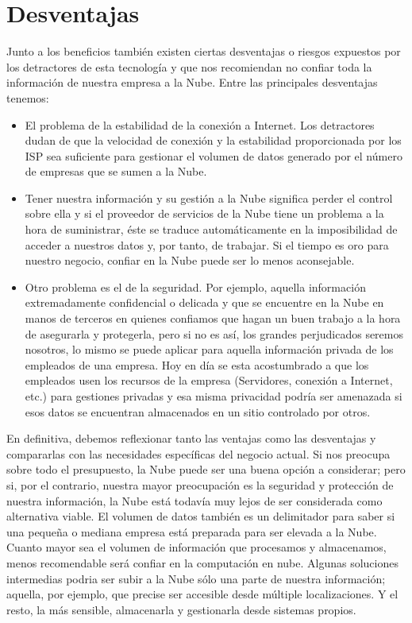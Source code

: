\documentclass[a4paper, 12pt]{report}
\begin{document}
\section{Desventajas}
\begin{justify}
Junto a los beneficios tambi\'en existen ciertas desventajas o riesgos expuestos por los
detractores de esta tecnolog\'ia y que nos recomiendan no confiar toda la informaci\'on de nuestra empresa a la Nube.
Entre las principales desventajas tenemos:
				\begin{itemize}
						\item{}El problema de la estabilidad de la conexi\'on a Internet. Los detractores dudan de que la velocidad de conexi\'on y la estabilidad proporcionada por los ISP sea suficiente para gestionar el volumen de datos generado por el n\'umero de empresas que se sumen a la Nube. 
						\item{} Tener nuestra informaci\'on y su gesti\'on a la Nube significa perder el control sobre ella y si el proveedor de servicios de la Nube tiene un problema a la hora de suministrar, \'este se traduce autom\'aticamente en la imposibilidad de acceder a nuestros datos y, por tanto, de trabajar. Si el tiempo es oro para nuestro negocio, confiar en la Nube puede ser lo menos aconsejable.

						\item{}Otro problema es el de la seguridad. Por ejemplo, aquella informaci\'on extremadamente confidencial o delicada y que se encuentre en la Nube en manos de terceros en quienes confiamos que hagan un buen trabajo a la hora de asegurarla y protegerla, pero si no es as\'i, los grandes perjudicados seremos nosotros, lo mismo se puede aplicar para aquella información privada de los empleados de una empresa. Hoy en d\'ia se esta acostumbrado a que los empleados usen los recursos de la empresa (Servidores, conexi\'on a Internet, etc.) para gestiones privadas y esa misma privacidad podr\'ia ser amenazada si esos datos se encuentran almacenados en un sitio controlado por otros. 
				\end{itemize}
				
En definitiva, debemos reflexionar tanto las ventajas como las desventajas y compararlas con las necesidades espec\'ificas del negocio actual. Si nos preocupa sobre todo el presupuesto, la Nube puede ser una buena opci\'on a considerar; pero si, por el contrario, nuestra mayor preocupaci\'on es la seguridad y protecci\'on de nuestra informaci\'on, la Nube está todavía muy lejos de ser considerada como alternativa viable.
\newpage
El volumen de datos tambi\'en es un delimitador para saber si una pequeña o mediana empresa est\'a preparada para ser elevada a la Nube. Cuanto mayor sea el volumen de informaci\'on que procesamos y
almacenamos, menos recomendable será confiar en la computación en nube. Algunas soluciones intermedias podria ser subir a la Nube s\'olo una parte de nuestra informaci\'on; aquella, por ejemplo, que precise ser accesible desde m\'ultiple localizaciones. Y el resto, la m\'as sensible, almacenarla y gestionarla desde sistemas propios.
\end{justify}
\newpage
\end{document}
